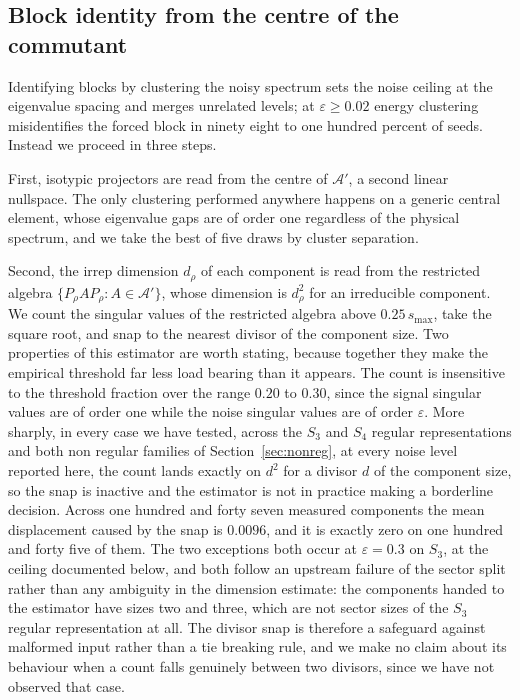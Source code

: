 \documentclass[10pt,a4paper]{amsart}
\begin{document}
\subsection{Block identity from the centre of the commutant}\label{sec:blockid}
Identifying blocks by clustering the noisy spectrum sets the noise ceiling at the
eigenvalue spacing and merges unrelated levels; at $\varepsilon\ge0.02$ energy
clustering misidentifies the forced block in ninety eight to one hundred percent
of seeds. Instead we proceed in three steps.

First, isotypic projectors are read from the centre of $\mathcal{A}'$, a second
linear nullspace. The only clustering performed anywhere happens on a generic
central element, whose eigenvalue gaps are of order one regardless of the
physical spectrum, and we take the best of five draws by cluster separation.

Second, the irrep dimension $d_\rho$ of each component is read from the
restricted algebra $\{P_\rho A P_\rho : A\in\mathcal{A}'\}$, whose dimension is
$d_\rho^2$ for an irreducible component. We count the singular values of the
restricted algebra above $0.25\,s_{\max}$, take the square root, and snap to the
nearest divisor of the component size. Two properties of this estimator are worth
stating, because together they make the empirical threshold far less load bearing
than it appears. The count is insensitive to the threshold fraction over the
range $0.20$ to $0.30$, since the signal singular values are of order one while
the noise singular values are of order $\varepsilon$. More sharply, in every case
we have tested, across the $S_3$ and $S_4$ regular representations and both non
regular families of Section~\ref{sec:nonreg}, at every noise level reported here,
the count lands exactly on $d^2$ for a divisor $d$ of the component size, so the
snap is inactive and the estimator is not in practice making a borderline
decision. Across one hundred and forty seven measured components the mean
displacement caused by the snap is $0.0096$, and it is exactly zero on one
hundred and forty five of them. The two exceptions both occur at
$\varepsilon=0.3$ on $S_3$, at the ceiling documented below, and both follow an
upstream failure of the sector split rather than any ambiguity in the dimension
estimate: the components handed to the estimator have sizes two and three, which
are not sector sizes of the $S_3$ regular representation at all. The divisor snap
is therefore a safeguard against malformed input rather than a tie breaking rule,
and we make no claim about its behaviour when a count falls genuinely between two
divisors, since we have not observed that case.
\end{document}
